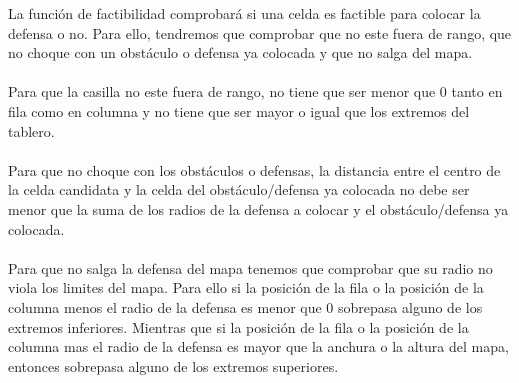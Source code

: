 La función de factibilidad comprobará si una celda es factible para colocar la defensa o no. Para ello, tendremos que comprobar que no este fuera de rango, que no choque con un obstáculo o defensa ya colocada y que no salga del mapa. \\\\
Para que la casilla no este fuera de rango, no tiene que ser menor que 0 tanto en fila como en columna y no tiene que ser mayor o igual que los extremos del tablero.\\\\
Para que no choque con los obstáculos o defensas, la distancia entre el centro de la celda candidata y la celda del obstáculo/defensa ya colocada no debe ser menor que la suma de los radios de la defensa a colocar y el obstáculo/defensa ya colocada.\\\\
Para que no salga la defensa del mapa tenemos que comprobar que su radio no viola los limites del mapa. Para ello si la posición de la fila o la posición de la columna menos el radio de la defensa es menor que 0 sobrepasa alguno de los extremos inferiores. Mientras que si la posición de la fila o la posición de la columna mas el radio de la defensa es mayor que la anchura o la altura del mapa, entonces sobrepasa alguno de los extremos superiores.


